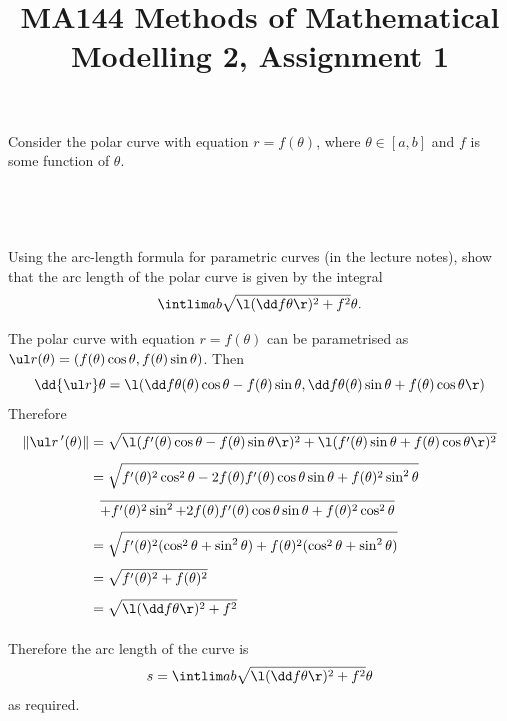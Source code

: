\documentclass[a4paper]{article}
\title{MA144 Methods of Mathematical Modelling 2, Assignment 1}
\begin{document}
\maketitle

\setlength{\parindent}{0em}
\setlength{\parskip}{1em}


\begin{questionbody}
Consider the polar curve with equation $r = f(\theta)$, where $\theta \in [a, b]$ and $f$ is some function of $\theta$.
\end{questionbody}

\subsection{~} %

\begin{questionbody}
Using the arc-length formula for parametric curves (in the lecture notes), show that the arc length of the polar curve is given by the integral \[
\intlim a b {\sqrt{\l( \dd f \theta \r)^2 + f^2}} \theta .
\]
\end{questionbody}

The polar curve with equation $r = f(\theta)$ can be parametrised as $\ul r (\theta) = (f(\theta) \cos \theta, f(\theta) \sin \theta)$. Then $$\dd{\ul r}\theta = \l(\dd f\theta (\theta) \cos \theta - f(\theta) \sin \theta, \dd f\theta (\theta) \sin \theta + f(\theta) \cos \theta\r)$$
Therefore \begin{align*}
\| \ul r\,'(\theta) \| &= \sqrt{\l( f'(\theta) \cos \theta - f(\theta) \sin \theta \r)^2 + \l( f'(\theta) \sin \theta + f(\theta) \cos \theta \r)^2}\\[1ex]
&= \sqrt{f'(\theta)^2 \cos^2 \theta - 2 f(\theta) f'(\theta) \cos\theta \sin\theta + f(\theta)^2 \sin^2 \theta}\\[1ex]
&\phantom{=} \overline{+ f'(\theta)^2 \sin^2 + 2 f(\theta) f'(\theta) \cos\theta \sin\theta + f(\theta)^2 \cos^2 \theta}\\[1ex]
&= \sqrt{f'(\theta)^2 (\cos^2 \theta + \sin^2 \theta) + f(\theta)^2 (\cos^2 \theta + \sin^2 \theta)}\\[1ex]
&= \sqrt{f'(\theta)^2 + f(\theta)^2}\\[1ex]
&= \sqrt{\l(\dd f\theta\r)^2 + f^2}\\[1ex]
\end{align*}

Therefore the arc length of the curve is $$s = \intlim ab {\sqrt{\l(\dd f\theta\r)^2 + f^2}}\theta$$ as required.
\end{document}
